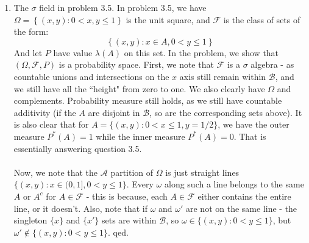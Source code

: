 \documentclass[12pt,a4paper]{article}
\newcommand{\1}[1]{\mathbbm{1}\left\{ #1 \right\}}
\newcommand{\acal}{\mathcal{A}}
\newcommand{\fcal}{\mathcal{F}}
\newcommand{\bcal}{\mathcal{B}}
\begin{document}
\begin{enumerate}
	\item The $\sigma$ field in problem 3.5. In problem 3.5, we have $\Omega = \left\{(x,y) : 0 < x,y \leq 1\right\}$ is the unit square, and $\fcal$ is the class of sets of the form:
	$$
		\left\{(x,y) : x \in A, 0 < y \leq 1\right\}
	$$
	And let $P$ have value $\lambda(A)$ on this set. In the problem, we show that $(\Omega,\fcal,P)$ is a probability space. First, we note that $\fcal$ is a $\sigma$ algebra - as countable unions and intersections on the $x$ axis still remain within $\bcal$, and we still have all the ``height" from zero to one. We also clearly have $\Omega$ and complements. Probability measure still holds, as we still have countable additivity (if the $A$ are disjoint in $\bcal$, so are the corresponding sets above). It is also clear that for $A = \{(x,y) : 0 < x \leq 1, y = 1/2\}$, we have the outer measure $P^*(A) = 1$ while the inner measure $P^*(A) = 0$. That is essentially answering question 3.5.
	\\\\
	Now, we note that the $\acal$ partition of $\Omega$ is just straight lines $\{(x,y) : x \in (0,1], 0 < y \leq 1\}$. Every $\omega$ along such a line belongs to the same $A$ or $A^c$ for $A \in \fcal$ - this is because, each $A \in \fcal$ either contains the entire line, or it doesn't. Also, note that if $\omega$ and $\omega'$ are not on the same line - the singleton $\{x\}$ and $\{x'\}$ sets are within $\bcal$, so $\omega \in \{(x,y): 0 < y \leq 1\}$, but $\omega' \not\in \{(x,y): 0 < y \leq 1\}$. qed.
\end{enumerate}
\end{document}
